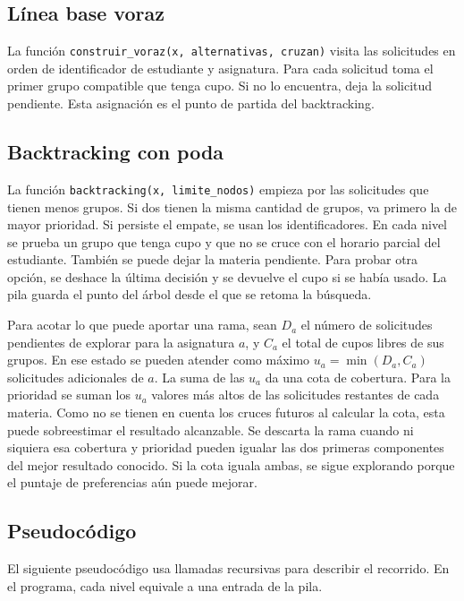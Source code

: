 \documentclass[11pt]{article}
\numberwithin{equation}{section}
\numberwithin{figure}{section}
\numberwithin{table}{section}
\theoremstyle{definition}
\begin{document}
\subsection{Línea base voraz}

La función \texttt{construir\_voraz(x, alternativas, cruzan)} visita
las solicitudes en orden de identificador de estudiante y asignatura.
Para cada solicitud toma el primer grupo compatible que tenga cupo.
Si no lo encuentra, deja la solicitud pendiente. Esta asignación es
el punto de partida del backtracking.

\subsection{Backtracking con poda}

La función \texttt{backtracking(x, limite\_nodos)} empieza por las
solicitudes que tienen menos grupos. Si dos tienen la misma cantidad
de grupos, va primero la de mayor prioridad. Si persiste el empate,
se usan los identificadores.
En cada nivel se prueba un grupo que tenga cupo y que no se cruce con
el horario parcial del estudiante. También se puede dejar la materia
pendiente. Para probar otra opción, se deshace la última decisión y se
devuelve el cupo si se había usado. La pila guarda el punto del árbol
desde el que se retoma la búsqueda.

Para acotar lo que puede aportar una rama, sean \(D_a\) el número de
solicitudes pendientes de explorar para la asignatura \(a\), y \(C_a\)
el total de cupos libres de sus grupos. En ese estado se pueden atender
como máximo \(u_a=\min(D_a,C_a)\) solicitudes adicionales de \(a\).
La suma de las \(u_a\) da una cota de cobertura. Para la prioridad se
suman los \(u_a\) valores más altos de las solicitudes restantes de cada
materia. Como no se tienen en cuenta los cruces futuros al calcular la
cota, esta puede sobreestimar el resultado alcanzable. Se descarta la
rama cuando ni siquiera esa cobertura y prioridad pueden igualar las
dos primeras componentes del mejor resultado conocido. Si la cota
iguala ambas, se sigue explorando porque el puntaje de preferencias
aún puede mejorar.

\subsection{Pseudocódigo}

El siguiente pseudocódigo usa llamadas recursivas para describir el
recorrido. En el programa, cada nivel equivale a una entrada de la pila.
\end{document}

